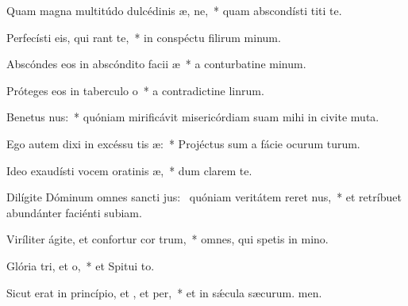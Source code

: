 \item Quam magna multitúdo dulcédinis æ, ne,~* quam abscondísti titi te.
\item Perfecísti eis, qui rant  te,~* in conspéctu filirum minum.
\item Abscóndes eos in abscóndito facii æ~* a conturbatine minum.
\item Próteges eos in taberculo o~* a contradictine linrum.
\item Benetus nus:~* quóniam mirificávit misericórdiam suam mihi in civite muta.
\item Ego autem dixi in excéssu tis æ:~* Projéctus sum a fácie ocurum turum.
\item Ideo exaudísti vocem oratinis æ,~* dum clarem  te.
\item Dilígite Dóminum omnes sancti jus:~\pscross{} quóniam veritátem reret nus,~* et retríbuet abundánter faciénti subiam.
\item Viríliter ágite, et confortur cor trum,~* omnes, qui spetis in mino.
\item Glória tri, et o,~* et Spitui to.
\item Sicut erat in princípio, et , et per,~* et in sǽcula sæcurum. men.
